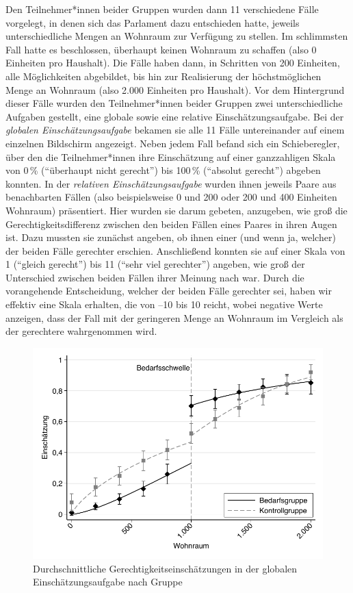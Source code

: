 \documentclass[justified,nobib,symmetric,twoside]{tufte-handout}
\begin{document}
Den Teilnehmer*innen beider Gruppen wurden dann 11 verschiedene Fälle vorgelegt, in denen sich das Parlament dazu entschieden hatte, jeweils unterschiedliche Mengen an Wohnraum zur Verfügung zu stellen.
Im schlimmsten Fall hatte es beschlossen, überhaupt keinen Wohnraum zu schaffen (also 0 Einheiten pro Haushalt).
Die Fälle haben dann, in Schritten von 200 Einheiten, alle Möglichkeiten abgebildet, bis hin zur Realisierung der höchstmöglichen Menge an Wohnraum (also 2.000 Einheiten pro Haushalt).
Vor dem Hintergrund dieser Fälle wurden den Teilnehmer*innen beider Gruppen zwei unterschiedliche Aufgaben gestellt, eine globale sowie eine relative Einschätzungsaufgabe.
Bei der \textit{globalen Einschätzungsaufgabe} bekamen sie alle 11 Fälle untereinander auf einem einzelnen Bildschirm angezeigt.
Neben jedem Fall befand sich ein Schieberegler, über den die Teilnehmer*innen ihre Einschätzung auf einer ganzzahligen Skala von 0\,\% (\enquote{überhaupt nicht gerecht}) bis 100\,\% (\enquote{absolut gerecht}) abgeben konnten.
In der \textit{relativen Einschätzungsaufgabe} wurden ihnen jeweils Paare aus benachbarten Fällen (also beispielsweise 0 und 200 oder 200 und 400 Einheiten Wohnraum) präsentiert.
Hier wurden sie darum gebeten, anzugeben, wie groß die Gerechtigkeitsdifferenz zwischen den beiden Fällen eines Paares in ihren Augen ist.
Dazu mussten sie zunächst angeben, ob ihnen einer (und wenn ja, welcher) der beiden Fälle gerechter erschien.
Anschließend konnten sie auf einer Skala von 1 (\enquote{gleich gerecht}) bis 11 (\enquote{sehr viel gerechter}) angeben, wie groß der Unterschied zwischen beiden Fällen ihrer Meinung nach war.
Durch die vorangehende Entscheidung, welcher der beiden Fälle gerechter sei, haben wir effektiv eine Skala erhalten, die von --10 bis 10 reicht, wobei negative Werte anzeigen, dass der Fall mit der geringeren Menge an Wohnraum im Vergleich als der gerechtere wahrgenommen wird.

\begin{figure}[t]\label{fig:abbildung_1}
   \center
   \includegraphics[width=0.99\linewidth]{figure_1.pdf}
   \caption{Durchschnittliche Gerechtigkeitseinschätzungen in der globalen Einschätzungsaufgabe nach Gruppe}
\end{figure}
\end{document}

